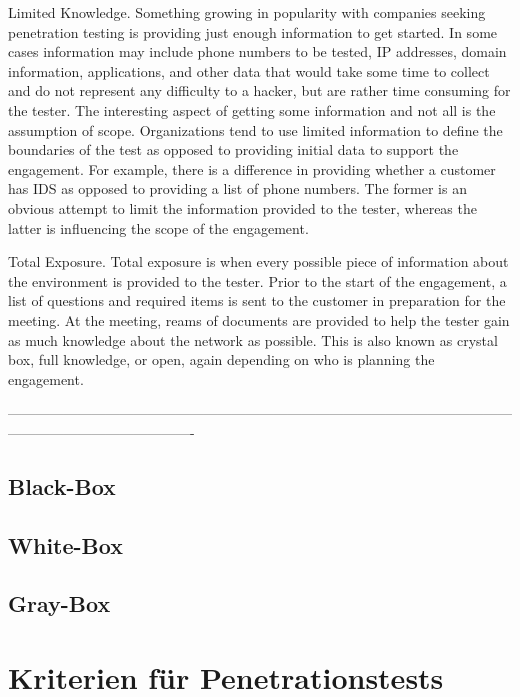Limited Knowledge. Something growing in popularity with companies
seeking penetration testing is providing just enough information to get
started. In some cases information may include phone numbers to be
tested, IP addresses, domain information, applications, and other data that
would take some time to collect and do not represent any difficulty to a
hacker, but are rather time consuming for the tester. The interesting aspect
of getting some information and not all is the assumption of scope.
Organizations tend to use limited information to define the boundaries of
the test as opposed to providing initial data to support the engagement.
For example, there is a difference in providing whether a customer has
IDS as opposed to providing a list of phone numbers. The former is an
obvious attempt to limit the information provided to the tester, whereas
the latter is influencing the scope of the engagement.

Total Exposure. Total exposure is when every possible piece of information
about the environment is provided to the tester. Prior to the start of
the engagement, a list of questions and required items is sent to the
customer in preparation for the meeting. At the meeting, reams of documents
are provided to help the tester gain as much knowledge about the
network as possible. This is also known as crystal box, full knowledge,
or open, again depending on who is planning the engagement.

\cite{tiller2004ethical}

----------------------------------------------------------------------------------------------------------------------------------------------------

\subsection{Black-Box}

\subsection{White-Box}

\subsection{Gray-Box}

\section{Kriterien für Penetrationstests}

